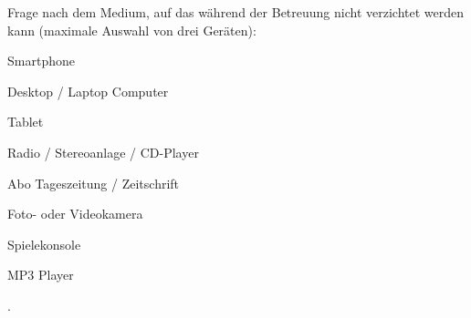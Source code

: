 Frage nach dem Medium, auf das während der Betreuung nicht verzichtet werden kann (maximale Auswahl von drei Geräten): 
\begin{seriate}
  \item Smartphone
  \item Desktop / Laptop Computer
  \item Tablet
  \item Radio / Stereoanlage / CD-Player
  \item Abo Tageszeitung / Zeitschrift
  \item Foto- oder Videokamera
  \item Spielekonsole
  \item MP3 Player
\end{seriate}.
